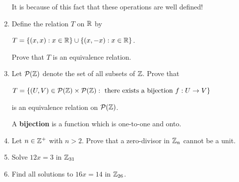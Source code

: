 \documentclass[11pt,fleqn,dvipsnames,usenames]{article}
\begin{document}
\begin{enumerate}
\note It is because of this fact that these operations are well defined!

\item Define the relation $T$ on $\mathbb{R}$ by
\begin{center}
$T = \left\{(x,x): x\in\mathbb{R}\right\}\cup \left\{(x,-x): x\in\mathbb{R}\right\}$.
\end{center}
Prove that $T$ is an equivalence relation.

\item Let $\mathcal{P}(\mathbb{Z})$ denote the set of all subsets of $\mathbb{Z}$.  Prove that
\begin{center}
$T = \left\{(U,V)\in \mathcal{P}(\mathbb{Z})\times\mathcal{P}(\mathbb{Z}):\text{ there exists a bijection }f:U\to V\right\}$
\end{center}
is an equivalence relation on $\mathcal{P}(\mathbb{Z})$.
\vsmsp

\recall A \textbf{bijection} is a function which is one-to-one and onto.

\item Let $n\in\mathbb{Z}^+$ with $n > 2$.  Prove that a zero-divisor in $\mathbb{Z}_n$ cannot be a unit.
\item Solve $12x = 3$ in $\mathbb{Z}_{31}$
\item Find all solutions to $16x = 14$ in $\mathbb{Z}_{26}$.
\end{enumerate}
\end{document}
